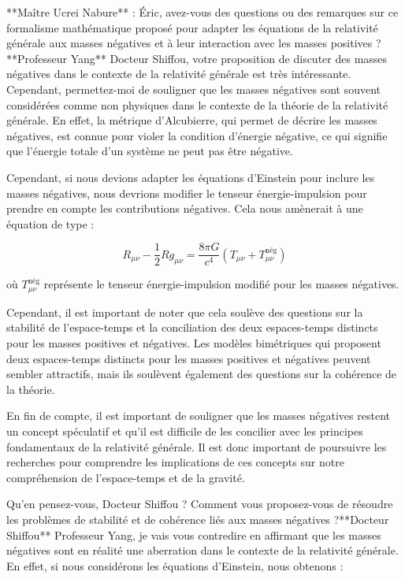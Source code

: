 **Maître Ucrei Nabure** : Éric, avez-vous des questions ou des remarques sur ce formalisme mathématique proposé pour adapter les équations de la relativité générale aux masses négatives et à leur interaction avec les masses positives ?
**Professeur Yang**
Docteur Shiffou, votre proposition de discuter des masses négatives dans le contexte de la relativité générale est très intéressante. Cependant, permettez-moi de souligner que les masses négatives sont souvent considérées comme non physiques dans le contexte de la théorie de la relativité générale. En effet, la métrique d'Alcubierre, qui permet de décrire les masses négatives, est connue pour violer la condition d'énergie négative, ce qui signifie que l'énergie totale d'un système ne peut pas être négative.

Cependant, si nous devions adapter les équations d'Einstein pour inclure les masses négatives, nous devrions modifier le tenseur énergie-impulsion pour prendre en compte les contributions négatives. Cela nous amènerait à une équation de type :

$$R_{\mu\nu} - \frac{1}{2}Rg_{\mu\nu} = \frac{8\pi G}{c^4}(T_{\mu\nu} + T_{\mu\nu}^{\mathrm{nég}})$$

où $T_{\mu\nu}^{\mathrm{nég}}$ représente le tenseur énergie-impulsion modifié pour les masses négatives.

Cependant, il est important de noter que cela soulève des questions sur la stabilité de l'espace-temps et la conciliation des deux espaces-temps distincts pour les masses positives et négatives. Les modèles bimétriques qui proposent deux espaces-temps distincts pour les masses positives et négatives peuvent sembler attractifs, mais ils soulèvent également des questions sur la cohérence de la théorie.

En fin de compte, il est important de souligner que les masses négatives restent un concept spéculatif et qu'il est difficile de les concilier avec les principes fondamentaux de la relativité générale. Il est donc important de poursuivre les recherches pour comprendre les implications de ces concepts sur notre compréhension de l'espace-temps et de la gravité.

Qu'en pensez-vous, Docteur Shiffou ? Comment vous proposez-vous de résoudre les problèmes de stabilité et de cohérence liés aux masses négatives ?**Docteur Shiffou**
Professeur Yang, je vais vous contredire en affirmant que les masses négatives sont en réalité une aberration dans le contexte de la relativité générale. En effet, si nous considérons les équations d'Einstein, nous obtenons :

